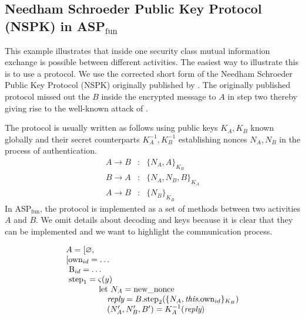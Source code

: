 \documentclass[10pt, conference, compsocconf]{IEEEtran}
\newcommand\aspfun{ASP${}_\text{fun}$\ }
\newcommand\aspfunp{ASP${}_\text{fun}$}
\newcommand{\symb}[1]{\makebox{\it #1}}
\begin{document}
{\subsection*{Needham Schroeder Public Key Protocol (NSPK) in \aspfun}
This example illustrates that inside one security class mutual information
exchange is possible between different activities. The easiest way to illustrate this 
is to use a protocol.
We use the corrected short form of the Needham Schroeder Public Key Protocol (NSPK) 
originally published by \cite{Needham78usingencryption}.
The originally published protocol missed out the $B$ inside the encrypted message to $A$ 
in step two thereby giving rise to the well-known attack of \cite{Lowe95anattack}.

The protocol is usually written as follows using public keys
$K_A, K_B$ known globally and their secret counterparts $K_{A}^{-1}, K_{B}^{-1}$ establishing 
nonces $N_A, N_B$ in the process of authentication.
\[
\begin{array}{lcl}
A \rightarrow B & : & \{N_A, A\}_{K_B}\\
B \rightarrow A & : & \{N_A,N_B,B\}_{K_A}\\
A \rightarrow B & : & \{N_B\}_{K_B}
\end{array}
\]
In \aspfunp, the protocol is implemented as a set of methods between two activities $A$ and $B$. 
We omit details about decoding and keys because it is clear that they can be implemented and we want to highlight the communication process.

\begin{small}
\[
\begin{array}{l}
A = [ \varnothing, \\
\left[ \text{own}_{id} = \dots \right. \\
\ \text{B}_{id} = \dots \\       
\ \text{step}_1 = \varsigma(y)\\
    \qquad \qquad \text{let}\ N_A = \text{new\_nonce}\\
    \qquad \qquad\quad \symb{reply} = B.\text{step}_2(\{N_A,\symb{this}.\text{own}_{id}\}_{K_B}) \\
    \qquad \qquad\quad  (N_A',N_B',B') = K_{A}^{-1}(\symb{reply})\\
     

\end{array}\]
\end{small}}
\end{document}
